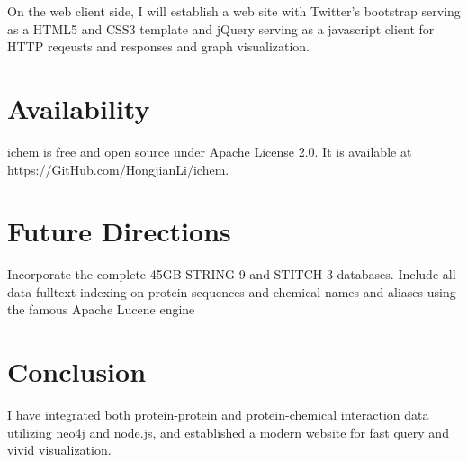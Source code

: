 \documentclass[10pt,conference,compsocconf]{../IEEEtran}
\begin{document}
On the web client side, I will establish a web site with Twitter's bootstrap serving as a HTML5 and CSS3 template and jQuery serving as a javascript client for HTTP reqeusts and responses and graph visualization.

\section{Availability}

ichem is free and open source under Apache License 2.0. It is available at https://GitHub.com/HongjianLi/ichem.

\section{Future Directions}

Incorporate the complete 45GB STRING 9 and STITCH 3 databases.
Include all data
fulltext indexing on protein sequences and chemical names and aliases using the famous Apache Lucene engine

\section{Conclusion}

I have integrated both protein-protein and protein-chemical interaction data utilizing neo4j and node.js, and established a modern website for fast query and vivid visualization.



\end{document}
